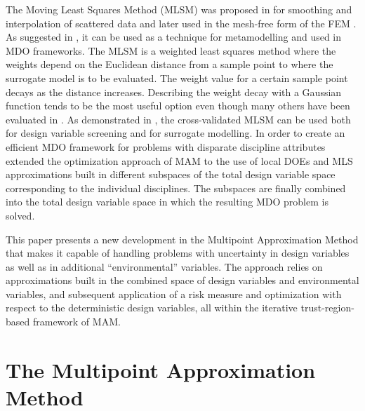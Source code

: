 \documentclass{llncs}
\begin{document}
The Moving Least Squares Method (MLSM) was proposed in \cite{LancasterSalkauskas1981} for smoothing and interpolation of scattered data and later used in the mesh-free form of the FEM \cite{Liszka1984}. As suggested in \cite{ChoiYounYang2001}, it can be used as a technique for metamodelling and used in MDO frameworks. The MLSM is a weighted least squares method where the weights depend on the Euclidean distance from a sample point to where the surrogate model is to be evaluated. The weight value for a certain sample point decays as the distance increases. Describing the weight decay with a Gaussian function tends to be the most useful option even though many others have been evaluated in \cite{ToropovSchrammSahaiJones2005}. As demonstrated in \cite{PolynkinToropov2010}, the cross-validated MLSM can be used both for design variable screening and for surrogate modelling. In order to create an efficient MDO framework for problems with disparate discipline attributes \cite{OllarToropovJones2014} extended the optimization approach of MAM to the use of local DOEs and MLS approximations built in different subspaces of the total design variable space corresponding to the individual disciplines. The subspaces are finally combined into the total design variable space in which the resulting MDO problem is solved.

This paper presents a new development in the Multipoint Approximation Method that makes it capable of handling problems with uncertainty in design variables as well as in additional ``environmental'' variables. The approach relies on approximations built in the combined space of design variables and environmental variables, and subsequent application of a risk measure and optimization with respect to the deterministic design variables, all within the iterative trust-region-based framework of MAM.

\section{The Multipoint Approximation Method}
\label{sec:MAM}
\end{document}
